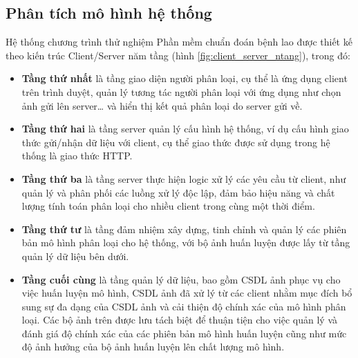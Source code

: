 \subsection{Phân tích mô hình hệ thống}
Hệ thống chương trình thử nghiệm Phần mềm chuẩn đoán bệnh lao được thiết kế theo kiến trúc Client/Server năm tầng (hình \ref{fig:client_server_ntang}), trong đó:
\begin{itemize}
	\item {\bf Tầng thứ nhất} là tầng giao diện người phân loại, cụ thể là ứng dụng client trên trình duyệt, quản lý tương tác người phân loại với ứng dụng như chọn ảnh gửi lên server… và hiển thị kết quả phân loại do server gửi về.
	\item {\bf Tầng thứ hai} là tầng server quản lý cấu hình hệ thống, ví dụ cấu hình giao thức gửi/nhận dữ liệu với client, cụ thể giao thức được sử dụng trong hệ thống là giao thức HTTP.
	\item {\bf Tầng thứ ba} là tầng server thực hiện logic xử lý các yêu cầu từ client, như	quản lý và phân phối các luồng xử lý độc lập, đảm bảo hiệu năng và chất lượng tính toán phân loại cho nhiều client trong cùng một thời điểm.
	\item {\bf Tầng thứ tư} là tầng đảm nhiệm xây dựng, tinh chỉnh và quản lý các phiên	bản mô hình phân loại cho hệ thống, với bộ ảnh huấn luyện được lấy từ tầng quản lý dữ liệu bên dưới.
	\item {\bf Tầng cuối cùng} là tầng quản lý dữ liệu, bao gồm CSDL ảnh phục vụ cho việc huấn luyện mô hình, CSDL ảnh đã xử lý từ các client nhằm mục đích bổ sung sự	đa dạng của CSDL ảnh và cải thiện độ chính xác của mô hình phân loại. Các bộ ảnh trên được lưu tách biệt để thuận tiện cho việc quản lý và đánh giá độ chính xác của các
	phiên bản mô hình huấn luyện cũng như mức độ ảnh hưởng của bộ ảnh huấn luyện lên chất lượng mô hình.
\end{itemize}
